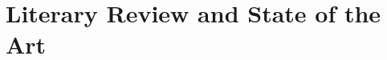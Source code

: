 \documentclass[12pt,twoside]{article}
\begin{document}
\section{Literary Review and State of the Art}
\label{section:LiteraryReviewAndStateOfTheArt}
\end{document}
